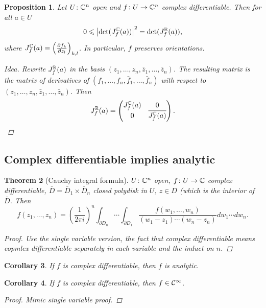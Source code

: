 \documentclass[A4paper, british]{amsart}
\theoremstyle{darkgreentheorem}
\newtheorem{thm}{Theorem}[section]
\newtheorem{prop}[thm]{Proposition}
\newtheorem{cor}[thm]{Corollary}
\theoremstyle{darkbluedefinition}
\theoremstyle{darkredexample}
\theoremstyle{remark}
\newcommand{\1}{\mathbbm{1}}
\begin{document}
\begin{prop}
    Let $U\colon \mathbb{C}^{n}$ open and $f\colon U\to \mathbb{C}^{n}$ complex differentiable.
    Then for all $a\in U$
    \[ 0\leqslant \left| \det(J_{f}^{\mathbb{C}}(a))\right|^{2}=\det(J_{f}^{\mathbb{R}}(a)),\]
    where $J_{f}^{\mathbb{C}}(a)=\left(\frac{\partial f_{k}}{\partial z_{l}}\right)_{k,l}$.
    In particular, $f$ preserves orientations.
    \begin{proof}[Idea]
	Rewrite $J_{f}^{\mathbb{R}}(a)$ in the basis $(z_{1},\ldots, z_{n},\bar{z}_{1},\ldots,\bar{z}_{n})$.
	The resulting matrix is the matrix of derivatives of $(f_{1},\ldots,f_{n},\bar{f}_{1},\ldots,\bar{f}_{n})$ with respect to $(z_{1},\ldots,z_{n},\bar{z}_{1},\ldots,\bar{z}_{n})$.
	Then
	\[ J_{f}^{\mathbb{R}}(a)=\begin{pmatrix} J_{f}^{\mathbb{C}}(a) & 0 \\ 0 & \overline{J_{f}^{\mathbb{C}}(a)}\end{pmatrix}. \]
    \end{proof}
\end{prop}

\subsection{Complex differentiable implies analytic}

\begin{thm}[Cauchy integral formula]
    $U\colon \mathbb{C}^{n}$ open, $f\colon U\to \mathbb{C}$ complex differentiable, $\bar{D}=\bar{D}_{1}\times \bar{D}_{n}$ closed polydisk in $U$, $z\in D$ (which is the interior of $\bar{D}$.
    Then
    \[f(z_{1},\ldots,z_{n})=\left(\frac{1}{2\pi i}\right)^{n}\int_{\partial D_{n}}\cdots \int_{\partial D_{1}}\frac{f(w_{1},\ldots,w_{n})}{(w_{1}-z_{1})\cdots (w_{n}-z_{n})}dw_{1}\cdots dw_{n}.\]
    \begin{proof}
	Use the single variable version, the fact that complex differentiable means copmlex differentiable separately in each variable and the induct on $n$.
    \end{proof}
\end{thm}

\begin{cor}
    If $f$ is complex differentiable, then $f$ is analytic.
\end{cor}

\begin{cor}
    If $f$ is complex differentiable, then $f\in \mathcal{C}^{\infty}$.
    \begin{proof}
	Mimic single variable proof.
    \end{proof}
\end{cor}
\end{document}
